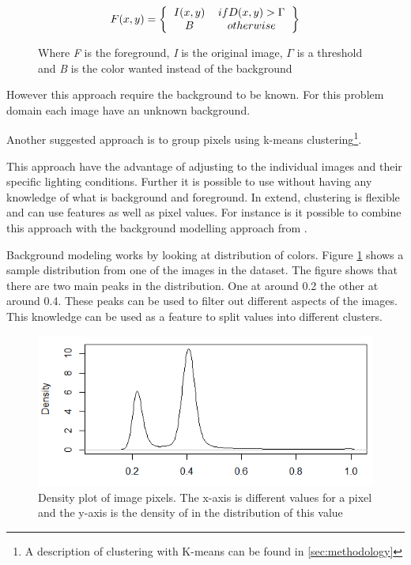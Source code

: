 \begin{figure}[H]
\begin{equation}
F(x,y) = \left \{
\begin{tabular}{cc}
$I(x,y)$ & $if D(x,y) > \Gamma$ \\
$B$      & $otherwise$
\end{tabular}  
\right \}
\end{equation}
\caption{Where \emph{F} is the foreground, \emph{I} is the original image, $\Gamma$ is a threshold and \emph{B} is the color wanted instead of the background}
\end{figure}

However this approach require the background to be known. For this problem domain each image have an unknown background.

Another suggested approach is to group pixels using k-means clustering\footnote{A description of clustering with K-means can be found in \ref{sec:methodology}}.

This approach have the advantage of adjusting to the individual images and their specific lighting conditions. Further it is possible to use without having any knowledge of what is background and foreground. 
In extend, clustering is flexible and can use features as well as pixel values.
For instance is it possible to combine this approach with the background modelling approach from \cite{backgroundRemoval}.
  
Background modeling works by looking at distribution of colors. Figure \ref{fig:pixeldistribution} shows a sample distribution from one of the images in the dataset. The figure shows that there are two main peaks in the distribution. One at around 0.2 the other at around 0.4. 
These peaks can be used to filter out different aspects of the images. This knowledge can be used as a feature to split values into different clusters.
 
\begin{figure}
\centering
\includegraphics[width=\linewidth]{Images/Distribution}
\caption{Density plot of image pixels. The x-axis is different values for a pixel and the y-axis is the density of in the distribution of this value}
\label{fig:pixeldistribution}
\end{figure}